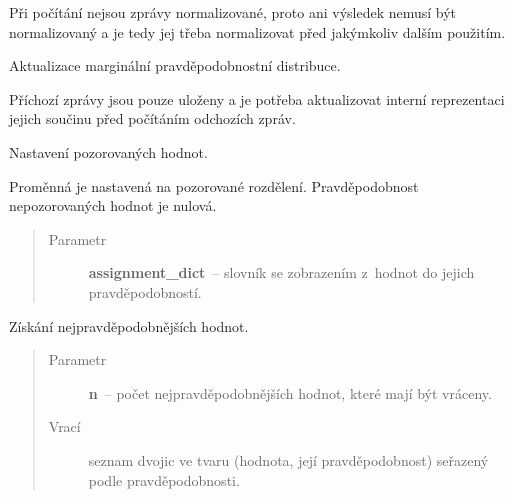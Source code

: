 \begin{fulllineitems}
\begin{fulllineitems}
Při počítání nejsou zprávy normalizované, proto ani výsledek nemusí být
normalizovaný a je tedy jej třeba normalizovat před jakýmkoliv dalším
použitím.

\end{fulllineitems}


\begin{fulllineitems}
\label{alex.infer:alex.infer.factor.alex.infer.node.DiscreteVariableNode.update}
Aktualizace marginální pravděpodobnostní distribuce.

Příchozí zprávy jsou pouze uloženy a je potřeba aktualizovat interní
reprezentaci jejich součinu před počítáním odchozích zpráv.

\end{fulllineitems}


\begin{fulllineitems}
\label{alex.infer:alex.infer.factor.alex.infer.node.DiscreteVariableNode.observed}
Nastavení pozorovaných hodnot.

Proměnná je nastavená na pozorované rozdělení. Pravděpodobnost nepozorovaných hodnot
je nulová.
\begin{quote}\begin{description}
\item[{Parametr}] \leavevmode
\textbf{assignment\_dict}~-- slovník se zobrazením z~hodnot do jejich pravděpodobností.

\end{description}\end{quote}

\end{fulllineitems}


\begin{fulllineitems}
\label{alex.infer:alex.infer.factor.alex.infer.node.DiscreteVariableNode.most_probable}
Získání nejpravděpodobnějších hodnot.
\begin{quote}\begin{description}
\item[{Parametr}] \leavevmode
\textbf{n}~-- počet nejpravděpodobnějších hodnot, které mají být vráceny.

\item[{Vrací}] \leavevmode
seznam dvojic ve tvaru (hodnota, její pravděpodobnost) seřazený podle pravděpodobnosti.

\end{description}\end{quote}

\end{fulllineitems}


\end{fulllineitems}

